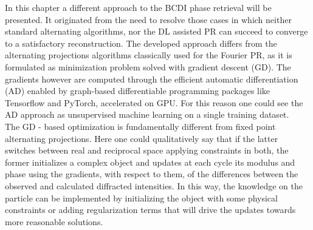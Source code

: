 
In this chapter a different approach to the BCDI phase retrieval will be presented. It originated from the need to resolve 
those cases in which neither standard alternating algorithms, nor the DL assisted PR can succeed to converge to a satisfactory 
reconstruction. The developed approach differs from the alternating projections algorithms classically used for 
the Fourier PR, as it is formulated as minimization problem solved with gradient descent (GD). The gradients however are computed 
through the efficient automatic differentiation (AD) enabled by graph-based differentiable programming packages like Tensorflow and 
PyTorch, accelerated on GPU. For this reason one could see the AD approach as unsupervised machine learning on a single training 
dataset.\\ 
The GD - based optimization is fundamentally different from fixed point alternating projections. Here one could qualitatively say 
that if the latter switches between real and reciprocal space applying constraints in both, the former initializes a 
complex object and updates at each cycle its modulus and phase using the gradients, with respect to them, of the differences 
between the observed and calculated diffracted intensities. In this way, the knowledge on the particle can be implemented 
by initializing the object with some physical constraints or adding regularization terms that will drive the updates 
towards more reasonable solutions. \\



